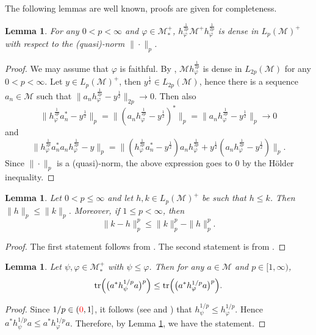 \documentclass[12pt]{article}
\newtheorem{lemma}[theorem]{Lemma}
\theoremstyle{definition}
\theoremstyle{remark}
\numberwithin{equation}{section}
\def\Me{\mathcal M}
\def\Tr{\mathrm{tr}}
\begin{document}
The following lemmas are well known, proofs are given for completeness.

\begin{lemma}\label{lemma:cone}
For any $0<p<\infty$ and $\varphi\in \Me_*^+$, 
$h_\varphi^{\frac1{2p}}\Me^+h_\varphi^{\frac1{2p}}$ is dense in $L_p(\Me)^+$ with respect
to the (quasi)-norm $\|\cdot\|_p$.
\end{lemma}

\begin{proof} We may assume that $\varphi$ is faithful. By \cite[Lemma 1.1]{junge2003noncommutative}, $\Me
h_\varphi^{\frac1{2p}}$ is dense in $L_{2p}(\Me)$ for any $0<p<\infty$. Let $y\in L_p(\Me)^+$, then
$y^{\frac12}\in L_{2p}(\Me)$, hence there is a sequence $a_n\in \Me$ such that
$\|a_nh^{\frac1{2p}}_\varphi-y^{\frac12}\|_{2p}\to 0$. Then also 
\[
\Big\|h^{\frac1{2p}}_\varphi a_n^*-y^{\frac12}\Big\|_p
=\Big\|(a_nh^{\frac1{2p}}_\varphi-y^{\frac12})^*\Big\|_p
=\Big\|a_nh^{\frac1{2p}}_\varphi-y^{\frac12}\Big\|_p\to 0
\]
and 
\[
\Big\|h^{\frac1{2p}}_\varphi a_n^*a_nh^{\frac1{2p}}_\varphi-y\Big\|_p
=\Big\|(h^{\frac1{2p}}_\varphi a_n^*-y^{\frac12})a_nh^{\frac1{2p}}_\varphi
+y^{\frac12}(a_nh^{\frac1{2p}}_\varphi-y^{\frac12})\Big\|_p.
\]
Since $\|\cdot\|_p$ is a (quasi)-norm, the above expression goes to 0 by the H\"older
inequality.
\end{proof}


\begin{lemma}\label{lemma:order1}
Let $0<p\le \infty$ and let $h,k\in L_p(\Me)^+$ be such
that $h\le k$. Then 
$\|h\|_p\le \|k\|_p$. Moreover, if $1\le p<\infty$, then 
\[
\|k-h\|_p^p\le \|k\|_p^p-\|h\|_p^p.
\]
\end{lemma}

\begin{proof} The first statement follows from \cite[Lemmas 2.5(iii) and 4.8]{fack1986generalized}.
The second statement is from \cite[Lemma 5.1]{fack1986generalized}.
\end{proof}

\begin{lemma}\label{lemma:order}
Let $\psi,\varphi\in \Me_*^+$ with $\psi\le \varphi$.
Then for any $a\in \Me$ and $p\in [1,\infty)$,
\[
\Tr\Bigl(\bigl(a^*h_\psi^{1/p}a\bigr)^p\Bigr)\le\Tr\Bigl(\bigl(a^*h_\varphi^{1/p}a\bigr)^p\Bigr).
\]
\end{lemma}

\begin{proof} Since $1/p\in ({\color{red}0},1]$, it follows (see \cite[Lemma B.7]{hiai2021quantum} and
\cite[Lemma 3.2]{hiai2021connections}) that $h_\psi^{1/p}\le h_\varphi^{1/p}$.  Hence
$a^*h_\psi^{1/p}a\le a^*h_\varphi^{1/p}a$. Therefore, by Lemma \ref{lemma:order1}, 
we have the statement.
\end{proof}
\end{document}
